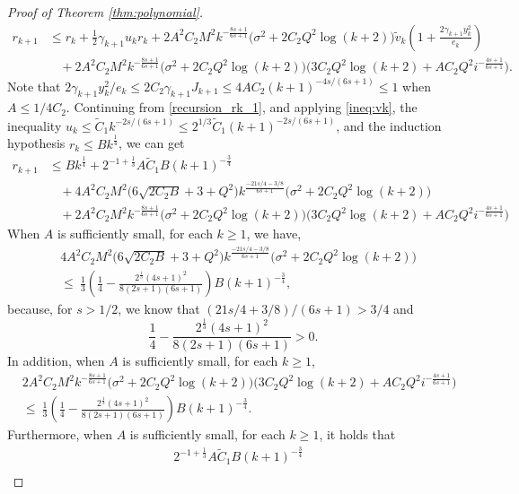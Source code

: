 \begin{proof}[Proof of Theorem \ref{thm:polynomial}]
\begin{align}
    r_{k+1} &\leq r_k + \frac{1}{2} \gamma_{k+1}u_kr_k +  2A^2C_2M^2k^{-\frac{8s+1}{6s+1}}\big(\sigma^2 + 2C_2Q^2\log(k+2)\big)\tilde v_{k}\left(1+ \frac{2\gamma_{k+1}y_{k}^2}{e_{k}}\right)\\
    &~~~~+ 2A^2C_2M^2k^{-\frac{8s+1}{6s+1}}\big(\sigma^2 + 2C_2Q^2\log(k+2)\big)\bigg(3C_2Q^2\log(k+2) + AC_2Q^2i^{-\frac{4s+1}{6s+1}}\bigg).\label{recursion_rk_1}
\end{align}
Note that $2\gamma_{k+1}y_k^2/e_k \leq 2C_2\gamma_{k+1}J_{k+1} \leq 4AC_2(k+1)^{-4s/(6s+1)} \leq 1$ when $A \leq 1/4C_2$. Continuing from \eqref{recursion_rk_1}, and applying \eqref{ineq:vk}, the inequality $u_k \leq \tilde C_1 k^{-2s/(6s+1)} \leq 2^{1/3}\tilde C_1(k+1)^{-2s/(6s+1)}$, and the induction hypothesis $r_k \leq Bk^{\frac{1}{4}}$, we can get 
\begin{align}
    r_{k+1} &\leq Bk^{\frac{1}{4}}+ 2^{-1+\frac{1}{3}}A\tilde C_1B(k+1)^{-\frac{3}{4}} \\
    &~~~~+ 4A^2C_2M^2\big(6\sqrt{2C_2B} + 3 + Q^2\big)k^{\frac{-21s/4 - 3/8}{6s+1}}\big(\sigma^2 + 2C_2Q^2\log(k+2)\big)\\
    &~~~~+ 2A^2C_2M^2k^{-\frac{8s+1}{6s+1}}\big(\sigma^2 + 2C_2Q^2\log(k+2)\big)\bigg(3C_2Q^2\log(k+2) + AC_2Q^2i^{-\frac{4s+1}{6s+1}}\bigg)\label{recursion_rk_2}
\end{align}
When $A$ is sufficiently small, for each $k \geq 1$, we have,
\begin{align}
    &4A^2C_2M^2\big(6\sqrt{2C_2B} + 3 + Q^2\big)k^{\frac{-21s/4 - 3/8}{6s+1}}\big(\sigma^2 + 2C_2Q^2\log(k+2)\big)\\ 
    &\leq~ \frac{1}{3}\left(\frac{1}{4} - \frac{2^{\frac{1}{3}}(4s+1)^2}{8(2s+1)(6s+1)}\right)B(k+1)^{-\frac{3}{4}},\label{rk_1}
\end{align}
because, for $s > 1/2$, we know that $(21s/4+3/8)/(6s+1) > 3/4$ and 
$$
\frac{1}{4} - \frac{2^{\frac{1}{3}}(4s+1)^2}{8(2s+1)(6s+1)} > 0.
$$
In addition, when $A$ is sufficiently small, for each $k \geq 1$,
\begin{align}
    &2A^2C_2M^2k^{-\frac{8s+1}{6s+1}}\big(\sigma^2 + 2C_2Q^2\log(k+2)\big)\bigg(3C_2Q^2\log(k+2) + AC_2Q^2i^{-\frac{4s+1}{6s+1}}\bigg)\\
    &\leq~ \frac{1}{3}\left(\frac{1}{4} - \frac{2^{\frac{1}{3}}(4s+1)^2}{8(2s+1)(6s+1)}\right)B(k+1)^{-\frac{3}{4}}.\label{rk_2}
\end{align}
Furthermore, when $A$ is sufficiently small, for each $k \geq 1$, it holds that
\begin{align}
    &2^{-1+\frac{1}{3}}A\tilde C_1B(k+1)^{-\frac{3}{4}} \\

\end{align}
\end{proof}
